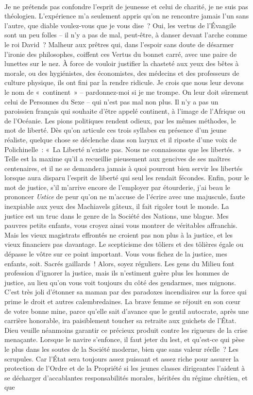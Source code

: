 \documentclass[french,twoside]{book} %
\begin{document}
\noindent  \par
Je ne prétends pas confondre l’esprit de jeunesse et celui de charité, je ne suis pas théologien. L’expérience m’a seulement appris qu’on ne rencontre jamais l’un sans l’autre, que diable voulez-vous que je vous dise ? Oui, les vertus de l’Évangile sont un peu folles – il n’y a pas de mal, peut-être, à danser devant l’arche comme le roi David ? Malheur aux prêtres qui, dans l’espoir sans doute de désarmer l’ironie des philosophes, coiffent ces Vertus du bonnet carré, avec une paire de lunettes sur le nez. À force de vouloir justifier la chasteté aux yeux des bêtes à morale, ou des hygiénistes, des économistes, des médecins et des professeurs de culture physique, ils ont fini par la rendre ridicule. Je crois que nous leur devons le nom de « continent » – pardonnez-moi si je me trompe. On leur doit sûrement celui de Personnes du Sexe – qui n’est pas mal non plus. Il n’y a pas un paroissien français qui souhaite d’être appelé continent, à l’image de l’Afrique ou de l’Océanie. Les pions politiques rendent odieux, par les mêmes méthodes, le mot de liberté. Dès qu’on articule ces trois syllabes en présence d’un jeune réaliste, quelque chose se déclenche dans son larynx et il riposte d’une voix de Polichinelle : « La Liberté n’existe pas. Nous ne connaissons que les libertés. » Telle est la maxime qu’il a recueillie pieusement aux gencives de ses maîtres centenaires, et il ne se demandera jamais à quoi pourront bien servir les libertés lorsque aura disparu l’esprit de liberté qui seul les rendait fécondes. Enfin, pour le mot de justice, s’il m’arrive encore de l’employer par étourderie, j’ai beau le prononcer \emph{Ustice} de peur qu’on ne m’accuse de l’écrire avec une majuscule, faute inexpiable aux yeux des Machiavels gâteux, il fait rigoler tout le monde. La justice est un truc dans le genre de la Société des Nations, une blague. Mes pauvres petits enfants, vous croyez ainsi vous montrer de véritables affranchis. Mais les vieux magistrats effrontés ne croient pas non plus à la justice, et les vieux financiers pas davantage. Le scepticisme des tôliers et des tôlières égale ou dépasse le vôtre sur ce point important. Vous vous fichez de la justice, mes enfants, soit. Sacrés gaillards ! Alors, soyez réguliers. Les gens du Milieu font profession d’ignorer la justice, mais ils n’estiment guère plus les hommes de justice, au lieu qu’on vous voit toujours du côté des gendarmes, mes mignons. C’est très joli d’étonner sa maman par des paradoxes incendiaires sur la force qui prime le droit et autres calembredaines. La brave femme se réjouit en son cœur de votre bonne mine, parce qu’elle sait d’avance que le gentil autocrate, après une carrière honorable, ira paisiblement toucher sa retraite aux guichets de l’État. Dieu veuille néanmoins garantir ce précieux produit contre les rigueurs de la crise menaçante. Lorsque le navire s’enfonce, il faut jeter du lest, et qu’est-ce qui pèse le plus dans les soutes de la Société moderne, bien que sans valeur réelle ? Les scrupules. Car l’État sera toujours assez puissant et assez riche pour assurer la protection de l’Ordre et de la Propriété si les jeunes classes dirigeantes l’aident à se décharger d’accablantes responsabilités morales, héritées du régime chrétien, et que 
\end{document}
